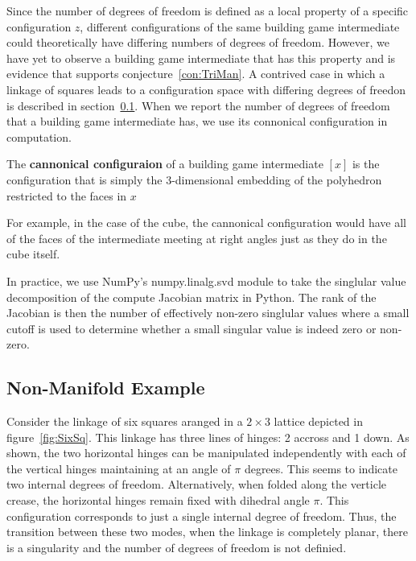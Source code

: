 Since the number of degrees of freedom is defined as a local property of a specific configuration $z$, different configurations of the same building game intermediate could theoretically have differing numbers of degrees of freedom. However, we have yet to observe a building game intermediate that has this property and is evidence that supports conjecture~\ref{con:TriMan}. A contrived case in which a linkage of squares leads to a configuration space with differing degrees of freedon is described in section~\ref{ssc:NonMan}. When we report the number of degrees of freedom that a building game intermediate has, we use its connonical configuration in computation.
\begin{mydef}
The \textbf{cannonical configuraion} of a building game intermediate $[x]$ is the configuration that is simply the $3$-dimensional embedding of the polyhedron restricted to the faces in $x$
\end{mydef}
For example, in the case of the cube, the cannonical configuration would have all of the faces of the intermediate  meeting at right angles just as they do in the cube itself. 

In practice, we use NumPy's numpy.linalg.svd module to take the singlular value decomposition of the compute Jacobian matrix in Python. The rank of the Jacobian is then the number of effectively non-zero singlular values where a small cutoff is used to determine whether a small singular value is indeed zero or non-zero.

\subsection{Non-Manifold Example}
\label{ssc:NonMan}

Consider the linkage of six squares aranged in a $2\times 3$ lattice depicted in figure~\ref{fig:SixSq}. This linkage has three lines of hinges: 2 accross and 1 down. As shown, the two horizontal hinges can be manipulated independently with each of the vertical hinges maintaining at an angle of $\pi$ degrees. This seems to indicate two internal degrees of freedom. Alternatively, when folded along the verticle crease, the horizontal hinges remain fixed with dihedral angle $\pi$. This configuration corresponds to just a single internal degree of freedom. Thus, the transition between these two modes, when the linkage is completely planar, there is a singularity and the number of degrees of freedom is not definied. 

